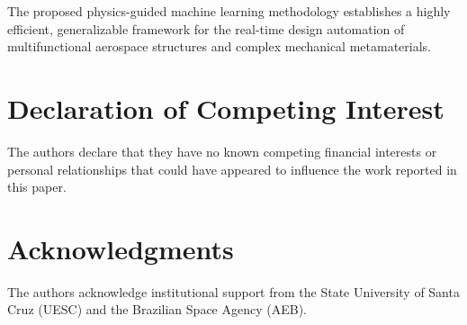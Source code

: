 \documentclass[preprint,12pt,3p]{elsarticle}
\begin{document}
The proposed physics-guided machine learning methodology establishes a highly efficient, generalizable framework for the real-time design automation of multifunctional aerospace structures and complex mechanical metamaterials.

\section*{Declaration of Competing Interest}
The authors declare that they have no known competing financial interests or personal relationships that could have appeared to influence the work reported in this paper.

\section*{Acknowledgments}
The authors acknowledge institutional support from the State University of Santa Cruz (UESC) and the Brazilian Space Agency (AEB).



\end{document}
